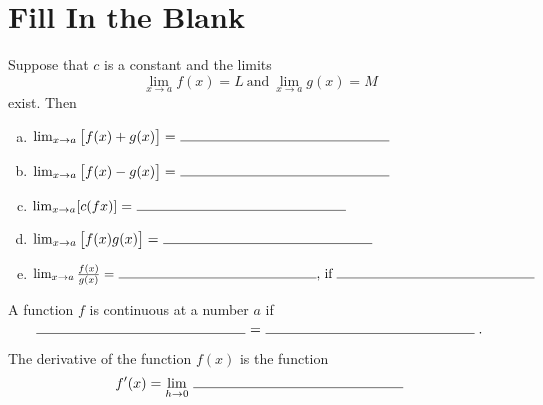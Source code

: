 \documentclass[12pt]{amsart}
\begin{document}
\newpage
\section*{Fill In the Blank}

\begin{thm}
  Suppose that \(c\) is a constant and the limits
  \[\lim_{x \to a} f(x) = L\ \text{and}\ \lim_{x \to a} g(x) = M\]
  exist.
  Then
    \begin{enumerate}[(a)]
    \item
      \(\lim_{x \to a} \left[f(x) + g(x)\right] =\ \line(1,0){150}\)
      \vspace{.25in}
    \item
      \(\lim_{x \to a} \left[f(x) - g(x)\right] =\ \line(1,0){150}\)
      \vspace{.25in}
    \item
      \(\lim_{x \to a} [c(fx)] =\ \line(1,0){150}\)
      \vspace{.25in}
    \item
      \(\lim_{x \to a} \left[f(x)g(x)\right] =\ \line(1,0){150}\)
      \vspace{.25in}
    \item
      \(\lim_{x \to a} \frac{f(x)}{g(x)} =\ \line(1,0){150},\, \text{if}\ \line(1,0){150}\)
      \vspace{.25in}
    \end{enumerate}
\end{thm}

\begin{thm}[2 Points]
  A function \(f\) is continuous at a number \(a\) if
  \vspace{.15in}
  \[\line(1,0){150}\ =\ \line(1,0){150}.\]
\end{thm}

\begin{thm}[1 Point]
  The derivative of the function \(f(x)\) is the function
  \vspace{.25in}
  \[f^\prime(x) = \lim_{h \to 0}\ \line(1,0){150}\]
\end{thm}
\end{document}
